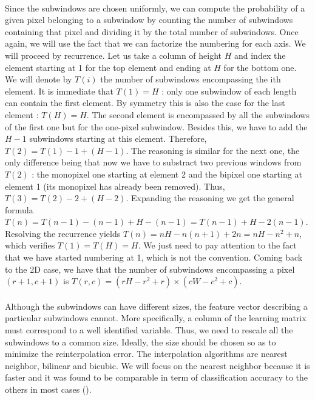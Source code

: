 \documentclass[a4paper]{report}
\begin{document}
		\paragraph{}
		Since the subwindows are chosen uniformly, we can compute the probability of a given pixel belonging to a subwindow by counting the number of subwindows containing that pixel and dividing it by the total number of subwindows. Once again, we will use the fact that we can factorize the numbering for each axis. We will proceed by recurrence. Let us take a column of height $H$ and index the element starting at 1 for the top element and ending at $H$ for the bottom one. We will denote by $T(i)$ the number of subwindows encompassing the ith element. It is immediate that $T(1) = H$ : only one subwindow of each length can contain the first element. By symmetry this is also the case for the last element : $T(H) = H$. The second element is encompassed by all the subwindows of the first one but for the one-pixel subwindow. Besides this, we have to add the $H-1$ subwindows starting at this element. Therefore, $T(2) = T(1) - 1 + (H -1)$. The reasoning is similar for the next one, the only difference being that now we have to substract two previous windows from $T(2)$ : the monopixel one starting at element 2 and the bipixel one starting at element 1 (its monopixel has already been removed). Thus, $T(3) = T(2) - 2 + (H - 2)$. Expanding the reasoning we get the general formula $T(n) = T(n-1) - (n-1) + H - (n-1) = T(n-1) + H - 2(n-1)$. Resolving the recurrence yields $T(n) = nH - n(n+1) + 2n = nH -n^2 + n$, which verifies $T(1) = T(H) = H$. We just need to pay attention to the fact that we have started numbering at 1, which is not the convention.
		Coming back to the 2D case, we have that the number of subwindows encompassing a pixel $(r+1,c+1)$ is $T(r,c) = (rH - r^2 + r) \times (cW - c^2 + c)$.
		
		\paragraph{}
		Although the subwindows can have different sizes, the feature vector describing a particular subwindows cannot. More specifically, a column of the learning matrix must correspond to a well identified variable. Thus, we need to rescale all the subwindows to a common size. Ideally, the size should be chosen so as to minimize the reinterpolation error. The interpolation algorithms are nearest neighbor, bilinear and bicubic. We will focus on the nearest neighbor because it is faster and it was found to be comparable in term of classification accuracy to the others in most cases (\cite{}).
		
\end{document}
